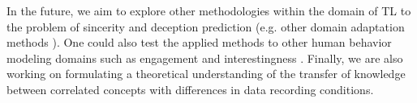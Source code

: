 \documentclass{article}
\begin{document}
\begin{spacing}{0.89}
In the future, we aim to explore other methodologies within the domain of TL to the problem of sincerity and deception prediction (e.g. other domain adaptation methods \cite{jiang2008literature}).
One could also test the applied methods to other human behavior modeling domains such as engagement \cite{gupta2016analysis} and interestingness \cite{freitas1999rule}.
Finally, we are also working on formulating a theoretical understanding of the transfer of knowledge between correlated concepts with differences in data recording conditions. 
\end{spacing}

\footnotesize
{


}
\end{document}
